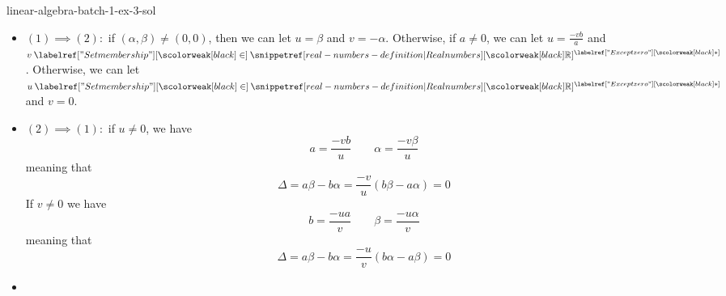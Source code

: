 \documentclass[preview]{standalone}
\begin{document}
\begin{snippetsolution}{linear-algebra-batch-1-ex-3-sol}{}
    \begin{itemize}
        \item \((1) \implies (2):\) if \((\alpha, \beta) \neq (0,0)\), then
        we can let \(u = \beta\) and \(v = -\alpha\). Otherwise,
        if \(a \neq 0\), we can let \(u = \frac{-vb}{a}\) and \(v\in\realnumbers^\exceptzero\).
        Otherwise, we can let \(u \in\realnumbers^\exceptzero\) and \(v = 0\).
        \item \((2) \implies (1):\) if \(u\neq 0\), we have
        \[
            a = \frac{-vb}{u}
            \qquad
            \alpha = \frac{-v\beta}{u}
        \]
        meaning that \[
            \Delta = a\beta - b\alpha = \frac{-v}{u}(b\beta - a\alpha) = 0
        \]
        If \(v \neq 0\) we have
        \[
            b = \frac{-ua}{v}
            \qquad
            \beta = \frac{-u\alpha}{v}
        \]
        meaning that
        \[
            \Delta = a\beta - b\alpha = \frac{-u}{v}(b\alpha - a\beta) = 0
        \]
        \item \todo
    \end{itemize}
\end{snippetsolution}

%
\end{document}
